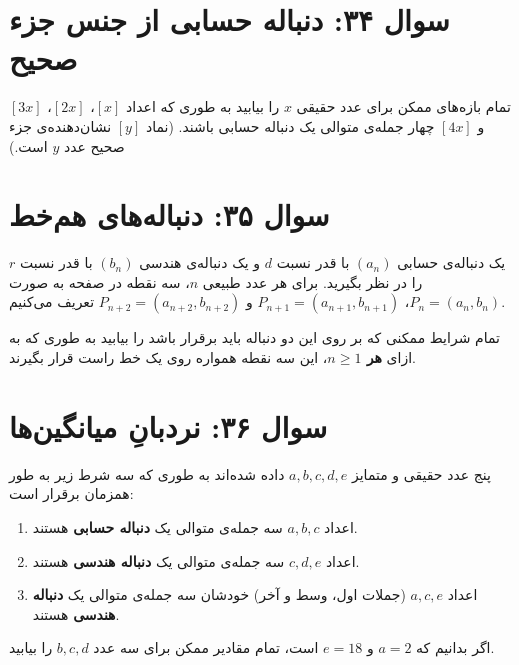 \documentclass[12pt]{article}
\begin{document}
	\vspace{1cm}
	\hrulefill
	\vspace{1cm}
	
	\section*{سوال ۳۴: دنباله حسابی از جنس جزء صحیح}
	تمام بازه‌های ممکن برای عدد حقیقی \(x\) را بیابید به طوری که اعداد \([x]\)، \([2x]\)، \([3x]\) و \([4x]\) چهار جمله‌ی متوالی یک دنباله حسابی باشند. (نماد \([y]\) نشان‌دهنده‌ی جزء صحیح عدد \(y\) است.)
	
	\vspace{1cm}
	\hrulefill
	\vspace{1cm}
	
	\section*{سوال ۳۵: دنباله‌های هم‌خط }
	یک دنباله‌ی حسابی \( (a_n) \) با قدر نسبت \(d\) و یک دنباله‌ی هندسی \( (b_n) \) با قدر نسبت \(r\) را در نظر بگیرید. برای هر عدد طبیعی \(n\)، سه نقطه در صفحه به صورت \(P_n = (a_n, b_n)\)، \(P_{n+1} = (a_{n+1}, b_{n+1})\) و \(P_{n+2} = (a_{n+2}, b_{n+2})\) تعریف می‌کنیم.
	\vspace{0.5cm}
	
	تمام شرایط ممکنی که بر روی این دو دنباله باید برقرار باشد را بیابید به طوری که به ازای \textbf{هر \(n \ge 1\)}، این سه نقطه همواره روی یک خط راست قرار بگیرند.
	
	\vspace{1cm}
	\hrulefill
	\vspace{1cm}
	
	\section*{سوال ۳۶: نردبانِ میانگین‌ها }
	پنج عدد حقیقی و متمایز \(a, b, c, d, e\) داده شده‌اند به طوری که سه شرط زیر به طور همزمان برقرار است:
	\begin{enumerate}[label=(\roman*)]
		\item اعداد \(a, b, c\) سه جمله‌ی متوالی یک \textbf{دنباله حسابی} هستند.
		\item اعداد \(c, d, e\) سه جمله‌ی متوالی یک \textbf{دنباله هندسی} هستند.
		\item اعداد \(a, c, e\) (جملات اول، وسط و آخر) خودشان سه جمله‌ی متوالی یک \textbf{دنباله هندسی} هستند.
	\end{enumerate}
	اگر بدانیم که \(a = 2\) و \(e = 18\) است، تمام مقادیر ممکن برای سه عدد \(b, c, d\) را بیابید.
	
\end{document}
